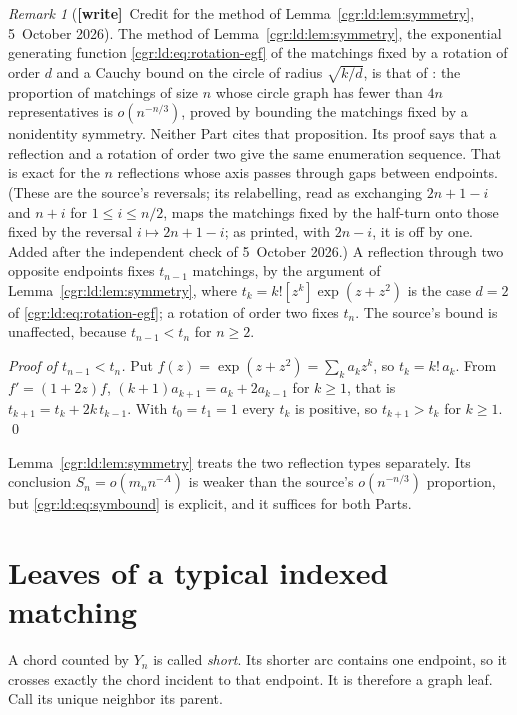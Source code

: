 \documentclass[11pt,letterpaper]{article}
\numberwithin{equation}{section}
\theoremstyle{definition}\newtheorem{definition}[theorem]{Definition}
\theoremstyle{remark}\newtheorem{remark}[theorem]{Remark}
\newcommand{\wtag}{\textup{\textbf{[write]}}}
\begin{document}
\begin{remark}[\wtag\ Credit for the method of Lemma~\ref{cgr:ld:lem:symmetry}, 5~October 2026]\label{cgr:ld:rem:symmetry-credit}
The method of Lemma~\ref{cgr:ld:lem:symmetry}, the exponential generating function \eqref{cgr:ld:eq:rotation-egf} of the matchings fixed by a rotation of order $d$ and a Cauchy bound on the circle of radius $\sqrt{k/d}$, is that of \cite[Proposition 5.14]{BBFGP24}: the proportion of matchings of size $n$ whose circle graph has fewer than $4n$ representatives is $o(n^{-n/3})$, proved by bounding the matchings fixed by a nonidentity symmetry. Neither Part cites that proposition. Its proof says that a reflection and a rotation of order two give the same enumeration sequence. That is exact for the $n$ reflections whose axis passes through gaps between endpoints. (These are the source's reversals; its relabelling, read as exchanging $2n+1-i$ and $n+i$ for $1\le i\le n/2$, maps the matchings fixed by the half-turn onto those fixed by the reversal $i\mapsto2n+1-i$; as printed, with $2n-i$, it is off by one. Added after the independent check of 5~October 2026.) A reflection through two opposite endpoints fixes $t_{n-1}$ matchings, by the argument of Lemma~\ref{cgr:ld:lem:symmetry}, where $t_k=k![z^k]\exp(z+z^2)$ is the case $d=2$ of \eqref{cgr:ld:eq:rotation-egf}; a rotation of order two fixes $t_n$. The source's bound is unaffected, because $t_{n-1}<t_n$ for $n\ge2$.

\emph{Proof of $t_{n-1}<t_n$.} Put $f(z)=\exp(z+z^2)=\sum_ka_kz^k$, so $t_k=k!\,a_k$. From $f'=(1+2z)f$, $(k+1)a_{k+1}=a_k+2a_{k-1}$ for $k\ge1$, that is $t_{k+1}=t_k+2k\,t_{k-1}$. With $t_0=t_1=1$ every $t_k$ is positive, so $t_{k+1}>t_k$ for $k\ge1$. \qed

Lemma~\ref{cgr:ld:lem:symmetry} treats the two reflection types separately. Its conclusion $S_n=o(m_nn^{-A})$ is weaker than the source's $o(n^{-n/3})$ proportion, but \eqref{cgr:ld:eq:symbound} is explicit, and it suffices for both Parts.
\end{remark}

\section{Leaves of a typical indexed matching}\label{cgr:ld:sec:leaves}
A chord counted by $Y_n$ is called \emph{short}. Its shorter arc
contains one endpoint, so it crosses exactly the chord incident to
that endpoint. It is therefore a graph leaf. Call its unique
neighbor its parent.
\end{document}
